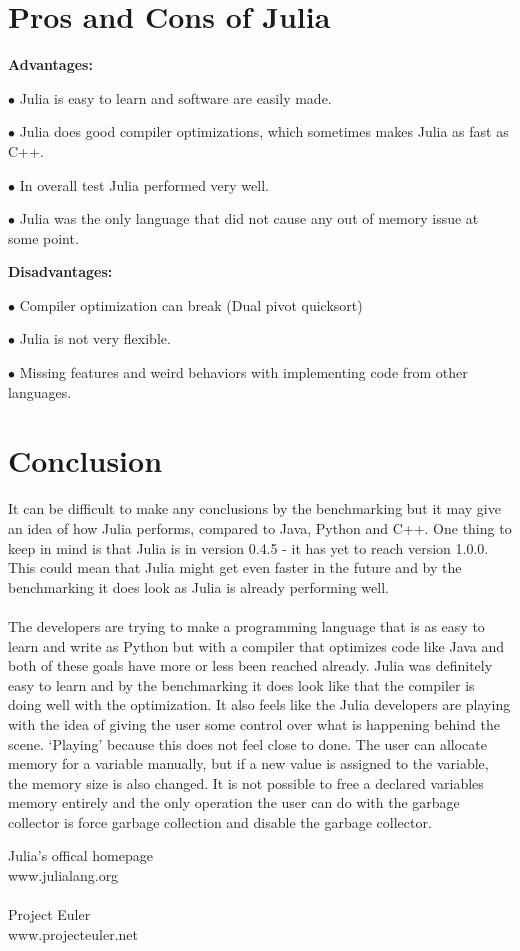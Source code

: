 \documentclass[landscape, a0]{sciposter}
\begin{document}
\begin{multicols}{3}
\section{Pros and Cons of Julia}
\textbf{Advantages:}
\begin{list}{}{}
	\item[$\bullet$] Julia is easy to learn and software are easily made.
	\item[$\bullet$] Julia does good compiler optimizations, which sometimes makes Julia as fast as C++.
	\item[$\bullet$] In overall test Julia performed very well.
	\item[$\bullet$] Julia was the only language that did not cause any out of memory issue at some point.
\end{list}
\textbf{Disadvantages:}
\begin{list}{}{}
	\item[$\bullet$] Compiler optimization can break (Dual pivot quicksort)
	\item[$\bullet$] Julia is not very flexible.
	\item[$\bullet$] Missing features and weird behaviors with implementing code from other languages.
\end{list}

\section{Conclusion}
It can be difficult to make any conclusions by the benchmarking but it may give an idea of how Julia performs, compared to Java, Python and C++. One thing to keep in mind is that Julia is in version 0.4.5 - it has yet to reach version 1.0.0. This could mean that Julia might get even faster in the future and by the benchmarking it does look as Julia is already performing well. \\ \\ The developers are trying to make a programming language that is as easy to learn and write as Python but with a compiler that optimizes code like Java and both of these goals have more or less been reached already. Julia was definitely easy to learn and by the benchmarking it does look like that the compiler is doing well with the optimization. It also feels like the Julia developers are playing with the idea of giving the user some control over what is happening behind the scene. ‘Playing’ because this does not feel close to done. The user can allocate memory for a variable manually, but if a new value is assigned to the variable, the memory size is also changed. It is not possible to free a declared variables memory entirely and the only operation the user can do with the garbage collector is force garbage collection and disable the garbage collector. 

\begin{thebibliography}{m}

Julia's offical homepage\\
www.julialang.org\\
\\
Project Euler\\
www.projecteuler.net


\end{thebibliography}


\end{multicols}
\end{document}
